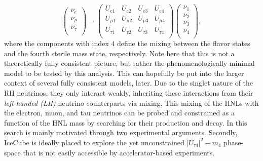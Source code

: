 \begin{equation}
    \label{eq:3_by_4_mixing_matrix}
    \begin{pmatrix}
    \nu_{e}\\
    \nu_{\mu}\\
    \nu_{\tau}\\
    \end{pmatrix}
    =
    \begin{pmatrix}
    U_{e1} & U_{e2} & U_{e3} & U_{e4}\\
    U_{\mu1} & U_{\mu2} & U_{\mu3} & U_{\mu4}\\
    U_{\tau1} & U_{\tau2} & U_{\tau3} & U_{\tau4}\\
    \end{pmatrix}
    \begin{pmatrix}
    \nu_{1}\\
    \nu_{2}\\
    \nu_{3}\\
    \nu_{4}\\
    \end{pmatrix},
\end{equation}
where the components with index $4$ define the mixing between the flavor states and the fourth sterile mass state, respectively. Note here that this is not a theoretically fully consistent picture, but rather the phenomenologically minimal model to be tested by this analysis. This can hopefully be put into the larger context of several fully consistent models, later. Due to the singlet nature of the RH neutrinos, they only interact weakly, inheriting these interactions from their \textit{left-handed (LH)} neutrino counterparts via mixing. This mixing of the HNLs with the electron, muon, and tau neutrinos can be probed and constrained as a function of the HNL mass by searching for their production and decay. In  this search is mainly motivated through two experimental arguments.
Secondly, IceCube is ideally placed to explore the yet unconstrained $|U_{\tau4}|^{2}-m_{4}$ phase-space that is not easily accessible by accelerator-based experiments.



